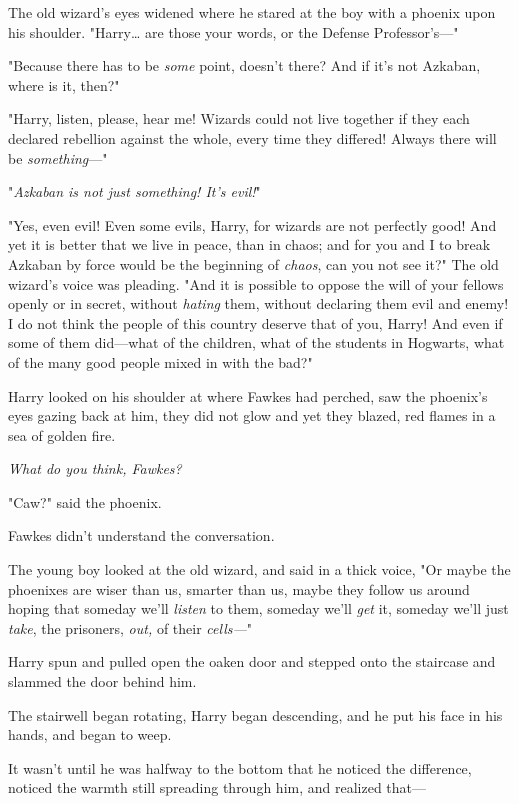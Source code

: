 The old wizard's eyes widened where he stared at the boy with a phoenix upon 
his shoulder. "Harry{\ldots} are those your words, or the Defense 
Professor's---"

"Because there has to be \emph{some} point, doesn't there? And if it's not 
Azkaban, where is it, then?"

"Harry, listen, please, hear me! Wizards could not live together if they each 
declared rebellion against the whole, every time they differed! Always there 
will be \emph{something}---"

"\emph{Azkaban is not just something! It's evil!}"

"Yes, even evil! Even some evils, Harry, for wizards are not perfectly good! 
And yet it is better that we live in peace, than in chaos; and for you and I to 
break Azkaban by force would be the beginning of \emph{chaos}, can you not see 
it?" The old wizard's voice was pleading. "And it is possible to oppose the 
will of your fellows openly or in secret, without \emph{hating} them, without 
declaring them evil and enemy! I do not think the people of this country 
deserve that of you, Harry! And even if some of them did---what of the 
children, what of the students in Hogwarts, what of the many good people mixed 
in with the bad?"

Harry looked on his shoulder at where Fawkes had perched, saw the phoenix's 
eyes gazing back at him, they did not glow and yet they blazed, red flames in a 
sea of golden fire.

\emph{What do you think, Fawkes?}

"Caw?" said the phoenix.

Fawkes didn't understand the conversation.

The young boy looked at the old wizard, and said in a thick voice, "Or maybe 
the phoenixes are wiser than us, smarter than us, maybe they follow us around 
hoping that someday we'll \emph{listen} to them, someday we'll \emph{get} it, 
someday we'll just \emph{take}, the prisoners, \emph{out,} of their 
\emph{cells---}"

Harry spun and pulled open the oaken door and stepped onto the staircase and 
slammed the door behind him.

The stairwell began rotating, Harry began descending, and he put his face in 
his hands, and began to weep.

It wasn't until he was halfway to the bottom that he noticed the difference, 
noticed the warmth still spreading through him, and realized that---

